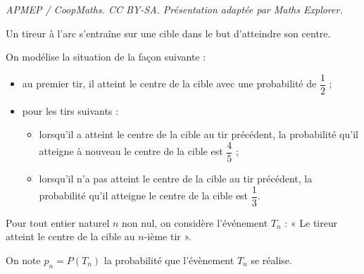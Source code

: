 \documentclass[10pt]{article}
\begin{document}
\noindent\textit{APMEP / CoopMaths. CC BY-SA. Présentation adaptée par Maths Explorer.}\par\medskip
Un tireur à l'arc s'entraîne sur une cible dans le but d'atteindre son centre.

On modélise la situation de la façon suivante :

\begin{itemize}
\item au premier tir, il atteint le centre de la cible avec une probabilité de $\dfrac{1}{2}$ ;
\item pour les tirs suivants :
\begin{itemize}
\item lorsqu'il a atteint le centre de la cible au tir précédent, la probabilité qu'il atteigne à nouveau le centre de la cible est $\dfrac{4}{5}$ ;
\item lorsqu'il n'a pas atteint le centre de la cible au tir précédent, la probabilité qu'il atteigne le centre de la cible est $\dfrac{1}{3}$.
\end{itemize}
\end{itemize}

Pour tout entier naturel $n$ non nul, on considère l'événement $T_n$ : « Le tireur atteint le centre de la cible au $n$-ième tir ».

On note $p_n = P\left(T_n\right)$ la probabilité que l'évènement $T_n$ se réalise.
\end{document}
